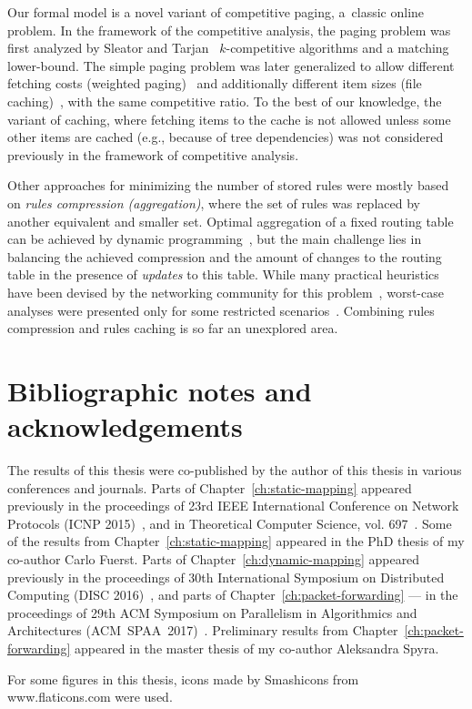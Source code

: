 Our formal model is a novel variant of competitive paging, a~classic online
problem. In the framework of the competitive analysis, the paging problem was
first analyzed  by Sleator and Tarjan~\cite{competitive-analysis} $k$-competitive algorithms and a matching lower-bound.
The simple paging problem was later generalized to allow different fetching
costs (weighted paging)~\cite{double-coverage,young-paging-greedy-dual} and
additionally different item sizes (file caching)~\cite{young-paging-landlord},
with the same competitive ratio.
To the best of our knowledge, the variant of caching, where fetching items to
the cache is not allowed unless some other items are cached (e.g., because of 
tree dependencies) was 
not considered previously in the framework of competitive analysis.

Other approaches for minimizing the number of stored rules were mostly based
on \emph{rules compression (aggregation)}, where the set of rules was replaced
by another equivalent and smaller set. Optimal aggregation of a fixed routing
table can be achieved by dynamic
programming~\cite{ortc,fib-compression-two-dimensional}, but the main
challenge lies in balancing the achieved compression and the amount of changes
to the routing table in the presence of \emph{updates} to this table. While
many practical heuristics have been devised by the networking community for
this problem~\cite{mms,fib-compression-fifa,fib-compression-globecom10,fib-compression-infocom13,fib-sigcomm,fib-compression-smalta,fib-compression-infocom10},
worst-case analyses were presented only for some restricted
scenarios~\cite{fib-icdcs,fib-sirocco}. Combining rules compression and rules
caching is so far an unexplored area.


\section{Bibliographic notes and acknowledgements}

The results of this thesis were co-published by the author of this thesis in various conferences and journals.
Parts of Chapter~\ref{ch:static-mapping} appeared previously in the proceedings of 23rd IEEE International Conference on Network Protocols (ICNP 2015)~\cite{my-icnp},
and in Theoretical Computer Science, vol. 697~\cite{my-tcs}.
Some of the results from Chapter~\ref{ch:static-mapping} appeared in the PhD thesis of my co-author Carlo Fuerst.
Parts of Chapter~\ref{ch:dynamic-mapping} appeared previously in the proceedings of 30th International Symposium on Distributed Computing (DISC 2016)~\cite{my-disc}, and parts of Chapter~\ref{ch:packet-forwarding} --- in the proceedings of 29th ACM Symposium on Parallelism in Algorithmics and Architectures (ACM~SPAA~2017)~\cite{my-spaa}.
Preliminary results from Chapter~\ref{ch:packet-forwarding} appeared in the master thesis of my co-author Aleksandra Spyra.

For some figures in this thesis, icons made by Smashicons from www.flaticons.com were used.